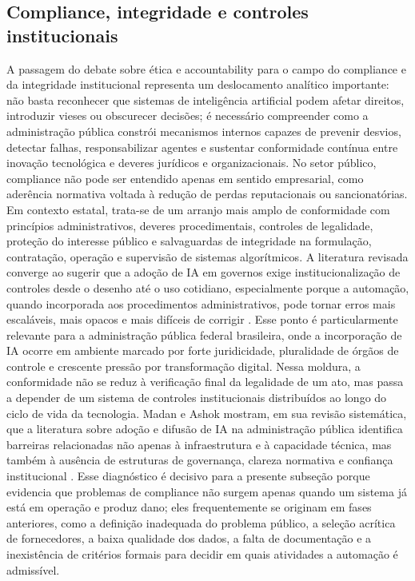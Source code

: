 \documentclass[12pt,a4paper]{article}
\begin{document}
\subsection{Compliance, integridade e controles institucionais}
\label{sec:org973c0bf}
A passagem do debate sobre ética e accountability para o campo do compliance e da integridade institucional representa um deslocamento analítico importante: não basta reconhecer que sistemas de inteligência artificial podem afetar direitos, introduzir vieses ou obscurecer decisões; é necessário compreender como a administração pública constrói mecanismos internos capazes de prevenir desvios, detectar falhas, responsabilizar agentes e sustentar conformidade contínua entre inovação tecnológica e deveres jurídicos e organizacionais. No setor público, compliance não pode ser entendido apenas em sentido empresarial, como aderência normativa voltada à redução de perdas reputacionais ou sancionatórias. Em contexto estatal, trata-se de um arranjo mais amplo de conformidade com princípios administrativos, deveres procedimentais, controles de legalidade, proteção do interesse público e salvaguardas de integridade na formulação, contratação, operação e supervisão de sistemas algorítmicos. A literatura revisada converge ao sugerir que a adoção de IA em governos exige institucionalização de controles desde o desenho até o uso cotidiano, especialmente porque a automação, quando incorporada aos procedimentos administrativos, pode tornar erros mais escaláveis, mais opacos e mais difíceis de corrigir \autocite{serra2024a} \autocite{parycek2023artificial} \autocite{batool2025ai}.
Esse ponto é particularmente relevante para a administração pública federal brasileira, onde a incorporação de IA ocorre em ambiente marcado por forte juridicidade, pluralidade de órgãos de controle e crescente pressão por transformação digital. Nessa moldura, a conformidade não se reduz à verificação final da legalidade de um ato, mas passa a depender de um sistema de controles institucionais distribuídos ao longo do ciclo de vida da tecnologia. Madan e Ashok mostram, em sua revisão sistemática, que a literatura sobre adoção e difusão de IA na administração pública identifica barreiras relacionadas não apenas à infraestrutura e à capacidade técnica, mas também à ausência de estruturas de governança, clareza normativa e confiança institucional \autocite{madan2022ai}. Esse diagnóstico é decisivo para a presente subseção porque evidencia que problemas de compliance não surgem apenas quando um sistema já está em operação e produz dano; eles frequentemente se originam em fases anteriores, como a definição inadequada do problema público, a seleção acrítica de fornecedores, a baixa qualidade dos dados, a falta de documentação e a inexistência de critérios formais para decidir em quais atividades a automação é admissível.
\end{document}
